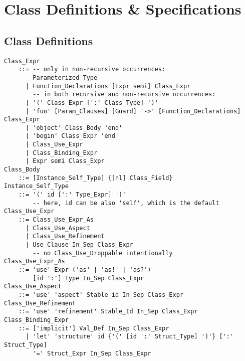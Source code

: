 \section{Class Definitions \& Specifications}
\label{sec:class-defs-specs}

\subsection{Class Definitions}
\label{sec:class-defs}

\grammar\begin{lstlisting}
Class_Expr
    ::= -- only in non-recursive occurrences:
        Parameterized_Type  
      | Function_Declarations [Expr semi] Class_Expr
        -- in both recursive and non-recursive occurrences:
      | '(' Class_Expr [':' Class_Type] ')'
      | 'fun' [Param_Clauses] [Guard] '->' [Function_Declarations] Class_Expr
      | 'object' Class_Body 'end'
      | 'begin' Class_Expr 'end'
      | Class_Use_Expr
      | Class_Binding_Expr
      | Expr semi Class_Expr
Class_Body
    ::= [Instance_Self_Type] {[nl] Class_Field}
Instance_Self_Type
    ::= '(' id [':' Type_Expr] ')'
        -- here, id can be also 'self', which is the default
Class_Use_Expr
    ::= Class_Use_Expr_As
      | Class_Use_Aspect
      | Class_Use_Refinement
      | Use_Clause In_Sep Class_Expr
        -- no Class_Use_Droppable intentionally 
Class_Use_Expr_As
    ::= 'use' Expr ('as' | 'as!' | 'as?')
        [id ':'] Type In_Sep Class_Expr
Class_Use_Aspect
    ::= 'use' 'aspect' Stable_id In_Sep Class_Expr
Class_Use_Refinement
    ::= 'use' 'refinement' Stable_Id In_Sep Class_Expr
Class_Binding_Expr
    ::= ['implicit'] Val_Def In_Sep Class_Expr
      | 'let' 'structure' id {'(' [id ':' Struct_Type] ')'} [':' Struct_Type]
        '=' Struct_Expr In_Sep Class_Expr


\end{lstlisting}

